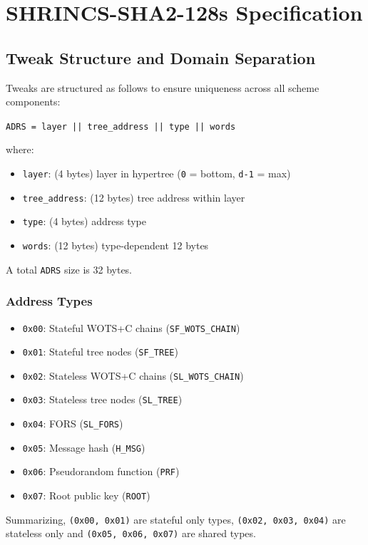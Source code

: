\section{SHRINCS-SHA2-128s Specification}

\subsection{Tweak Structure and Domain Separation}
Tweaks are structured as follows to ensure uniqueness across all scheme components:

\begin{center}
\texttt{ADRS = layer || tree\_address || type || words}
\end{center}
where: 
\begin{itemize}
    \item[] \texttt{layer}: (4 bytes) layer in hypertree (\texttt{0} = bottom, \texttt{d-1} = max)
    \item[] \texttt{tree\_address}: (12 bytes) tree address within layer
    \item[] \texttt{type}: (4 bytes) address type
    \item[] \texttt{words}: (12 bytes) type-dependent 12 bytes
\end{itemize}
A total \texttt{ADRS} size is 32 bytes.

\subsubsection{Address Types}
\begin{itemize}
    \item[] \texttt{0x00}: Stateful WOTS+C chains (\texttt{SF\_WOTS\_CHAIN})
    \item[] \texttt{0x01}: Stateful tree nodes (\texttt{SF\_TREE})
    \item[] \texttt{0x02}: Stateless WOTS+C chains (\texttt{SL\_WOTS\_CHAIN})
    \item[] \texttt{0x03}: Stateless tree nodes (\texttt{SL\_TREE})
    \item[] \texttt{0x04}: FORS (\texttt{SL\_FORS})
    \item[] \texttt{0x05}: Message hash (\texttt{H\_MSG})
    \item[] \texttt{0x06}: Pseudorandom function (\texttt{PRF})
    \item[] \texttt{0x07}: Root public key (\texttt{ROOT})
\end{itemize}
Summarizing, \texttt{(0x00, 0x01)} are stateful only types, \texttt{(0x02, 0x03, 0x04)} are stateless only and \texttt{(0x05, 0x06, 0x07)} are shared types.

